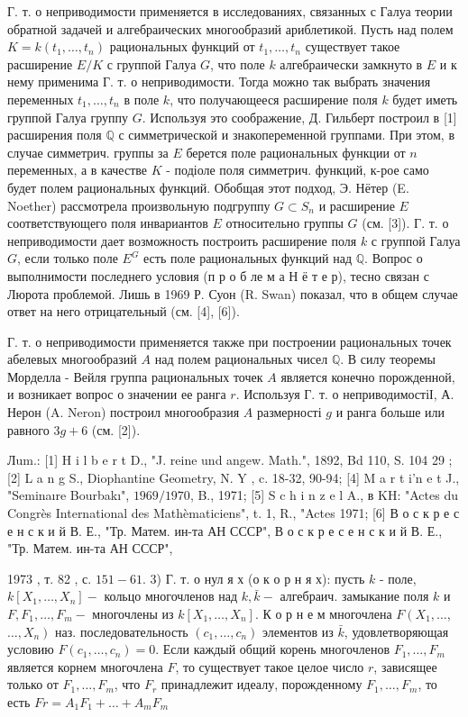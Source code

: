 \documentclass[10pt]{article}
\begin{document}
Г. т. о неприводимости применяется в исследованиях, связанных с Галуа теории обратной задачей и алгебраических многообразий ариблетикой. Пусть над полем $K=k\left(t_{1}, \ldots, t_{n}\right)$ рациональных функций от $t_{1}, \ldots, t_{n}$ существует такое расширение $E / K$ с группой Галуа $G$, что поле $k$ алгебраически замкнуто в $E$ и к нему применима $Г$. т. о неприводимости. Тогда можно так выбрать значения переменных $t_{1}, \ldots, t_{n}$ в поле $k$, что получающееся расширение поля $k$ будет иметь группой Галуа группу $G$. Используя это соображение, Д. Гильберт построил в [1] расширения поля $\mathbb{Q}$ с симметрической и знакопеременной группами. При этом, в случае симметрич. группы за $E$ берется поле рациональных функции от $n$ переменных, а в качестве $K$ - подіоле поля симметрич. функций, к-рое само будет полем рациональных функций. Обобщая этот подход, Э. Нётер (E. Noether) рассмотрела произвольную подгруппу $G \subset S_{n}$ и расширение $E$ соответствующего поля инвариантов $E$ относительно группы $G$ (см. [3]). Г. т. о неприводимости дает возможность построить расширение поля $k$ с группой Галуа $G$, если только поле $E^{G}$ есть поле рациональных функций над $\mathbb{Q}$. Вопрос о выполнимости последнего условия (п р о б ле м а Н ё т е р), тесно связан с Люрота проблемой. Лишь в 1969 Р. Суон (R. Swan) показал, что в общем случае ответ на него отрицательный (см. [4], [6]).



Г. т. о неприводимости применяется также при построении рациональных точек абелевых многообразий $A$ над полем рациональных чисел $\mathbb{Q}$. В силу теоремы Морделла - Вейля группа рациональных точек $A$ является конечно порожденной, и возникает вопрос о значении ее ранга $r$. Используя Г. т. о неприводимостіІ, А. Нерон (A. Neron) построил многообразия $A$ размерності $g$ и ранга больше или равного $3 g+6$ (см. [2]).



Лum.: [1] H i l b e r t D., "J. reine und angew. Math.", 1892, Bd 110, S. 104 29 ; [2] L a n g S., Diophantine Geometry, N. Y , c. 18-32, 90-94; [4] M a r t i'n e t J., "Seminaıre Bourbakı", $1969 / 1970$, B., 1971; [5] S c h i n z e l A., в KH: "Actes du Congrès International des Mathèmaticiens", t. 1, R., "Actes 1971; [6] В о с к р е с е н с к и й В. Е., "Тр. Матем. ин-та АН СССР", В о с к р е с е н с к и й В. Е., "Тр. Матем. ин-та АН СССР",

1973 , т. 82 , с. $151-61$. 3) Г. т. о нул я х (о к о р н я х): пусть $k$ - поле, $k\left[X_{1}, \ldots, X_{n}\right]-$ кольцо многочленов над $k, \bar{k}-$ алгебраич. замыкание поля $k$ и $F, F_{1}, \ldots, F_{m}-$ многочлены из $k\left[X_{1}, \ldots, X_{n}\right]$. К о р н е м многочлена $F\left(X_{1}, \ldots\right.$, $\left.\ldots, X_{n}\right)$ наз. последовательность $\left(c_{1}, \ldots, c_{n}\right)$ элементов из $\bar{k}$, удовлетворяющая условию $F\left(c_{1}, \ldots, c_{n}\right)=0$. Если каждый общий корень многочленов $F_{1}, \ldots, F_{m}$ является корнем многочлена $F$, то существует такое целое число $r$, зависящее только от $F_{1}, \ldots, F_{m}$, что $F_{r}$ принадлежит идеалу, порожденному $F_{1}, \ldots, F_{m}$, то есть $F r=A_{1} F_{1}+\ldots+A_{m} F_{m}$
\end{document}
